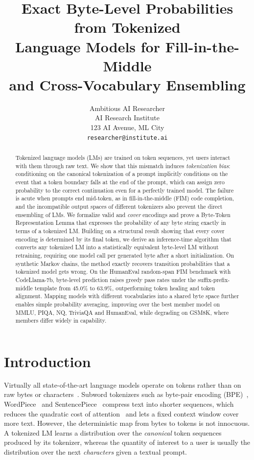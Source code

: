 \documentclass{article} %
\title{Exact Byte-Level Probabilities from Tokenized \\ Language Models for Fill-in-the-Middle \\ and Cross-Vocabulary Ensembling}
\author{Ambitious AI Researcher\\
AI Research Institute\\
123 AI Avenue, ML City\\
\texttt{researcher@institute.ai}
}
\begin{document}
\maketitle

\begin{abstract}
Tokenized language models (LMs) are trained on token sequences, yet users interact with them through raw text. We show that this mismatch induces \emph{tokenization bias}: conditioning on the canonical tokenization of a prompt implicitly conditions on the event that a token boundary falls at the end of the prompt, which can assign zero probability to the correct continuation even for a perfectly trained model. The failure is acute when prompts end mid-token, as in fill-in-the-middle (FIM) code completion, and the incompatible output spaces of different tokenizers also prevent the direct ensembling of LMs. We formalize valid and \emph{cover} encodings and prove a Byte-Token Representation Lemma that expresses the probability of any byte string exactly in terms of a tokenized LM. Building on a structural result showing that every cover encoding is determined by its final token, we derive an inference-time algorithm that converts any tokenized LM into a statistically equivalent byte-level LM without retraining, requiring one model call per generated byte after a short initialization. On synthetic Markov chains, the method exactly recovers transition probabilities that a tokenized model gets wrong. On the HumanEval random-span FIM benchmark with CodeLlama-7b, byte-level prediction raises greedy pass rates under the suffix-prefix-middle template from 45.0\% to 63.9\%, outperforming token healing and token alignment. Mapping models with different vocabularies into a shared byte space further enables simple probability averaging, improving over the best member model on MMLU, PIQA, NQ, TriviaQA and HumanEval, while degrading on GSM8K, where members differ widely in capability.
\end{abstract}

\section{Introduction}
\label{sec:intro}
Virtually all state-of-the-art language models operate on tokens rather than on raw bytes or characters~\citep{radford2019gpt2,brown2020gpt3,touvron2023llama2,jiang2023mistral}. Subword tokenizers such as byte-pair encoding (BPE)~\citep{gage1994bpe,sennrich2016bpe,wang2020bbpe}, WordPiece~\citep{schuster2012wordpiece} and SentencePiece~\citep{kudo2018sentencepiece} compress text into shorter sequences, which reduces the quadratic cost of attention~\citep{vaswani2017attention} and lets a fixed context window cover more text. However, the deterministic map from bytes to tokens is not innocuous. A tokenized LM learns a distribution over the \emph{canonical} token sequences produced by its tokenizer, whereas the quantity of interest to a user is usually the distribution over the next \emph{characters} given a textual prompt.
\end{document}
